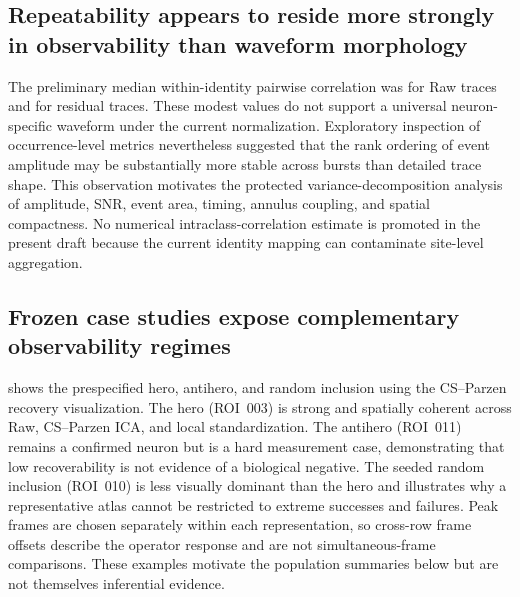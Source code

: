 
\subsection{Repeatability appears to reside more strongly in observability than waveform morphology}

The preliminary median within-identity pairwise correlation was \RawWithinSiteMedianCorrelation{} for Raw traces and \ResidualWithinSiteMedianCorrelation{} for residual traces. These modest values do not support a universal neuron-specific waveform under the current normalization. Exploratory inspection of occurrence-level metrics nevertheless suggested that the rank ordering of event amplitude may be substantially more stable across bursts than detailed trace shape. This observation motivates the protected variance-decomposition analysis of amplitude, SNR, event area, timing, annulus coupling, and spatial compactness. No numerical intraclass-correlation estimate is promoted in the present draft because the current identity mapping can contaminate site-level aggregation.


\subsection{Frozen case studies expose complementary observability regimes}

 shows the prespecified hero, antihero, and random
inclusion using the CS--Parzen recovery visualization. The hero (ROI~003) is
strong and spatially coherent across Raw, CS--Parzen ICA, and local
standardization. The antihero (ROI~011) remains a confirmed neuron but is a
hard measurement case, demonstrating that low recoverability is not evidence
of a biological negative. The seeded random inclusion (ROI~010) is less
visually dominant than the hero and illustrates why a representative atlas
cannot be restricted to extreme successes and failures. Peak frames are chosen
separately within each representation, so cross-row frame offsets describe the
operator response and are not simultaneous-frame comparisons. These examples
motivate the population summaries below but are not themselves inferential
evidence.

